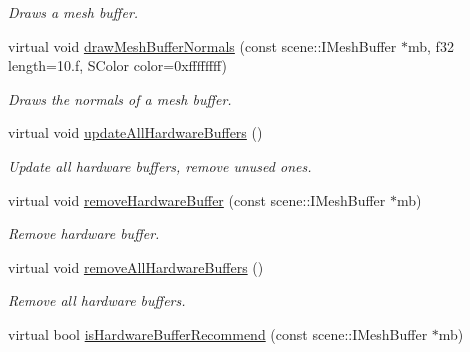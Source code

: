 \begin{DoxyCompactItemize}
\begin{DoxyCompactList}\small\item\em Draws a mesh buffer. \end{DoxyCompactList}\item 
\hypertarget{classirr_1_1video_1_1_c_null_driver_a63b636053102de5c2d72970001cf6ae7}{virtual void \hyperlink{classirr_1_1video_1_1_c_null_driver_a63b636053102de5c2d72970001cf6ae7}{draw\-Mesh\-Buffer\-Normals} (const scene\-::\-I\-Mesh\-Buffer $\ast$mb, f32 length=10.f, S\-Color color=0xffffffff)}\label{classirr_1_1video_1_1_c_null_driver_a63b636053102de5c2d72970001cf6ae7}

\begin{DoxyCompactList}\small\item\em Draws the normals of a mesh buffer. \end{DoxyCompactList}\item 
\hypertarget{classirr_1_1video_1_1_c_null_driver_a30a7473263d5fa362b1979d1191d2c8f}{virtual void \hyperlink{classirr_1_1video_1_1_c_null_driver_a30a7473263d5fa362b1979d1191d2c8f}{update\-All\-Hardware\-Buffers} ()}\label{classirr_1_1video_1_1_c_null_driver_a30a7473263d5fa362b1979d1191d2c8f}

\begin{DoxyCompactList}\small\item\em Update all hardware buffers, remove unused ones. \end{DoxyCompactList}\item 
\hypertarget{classirr_1_1video_1_1_c_null_driver_a757276dbbfcfca2227155bbef3fa3e29}{virtual void \hyperlink{classirr_1_1video_1_1_c_null_driver_a757276dbbfcfca2227155bbef3fa3e29}{remove\-Hardware\-Buffer} (const scene\-::\-I\-Mesh\-Buffer $\ast$mb)}\label{classirr_1_1video_1_1_c_null_driver_a757276dbbfcfca2227155bbef3fa3e29}

\begin{DoxyCompactList}\small\item\em Remove hardware buffer. \end{DoxyCompactList}\item 
\hypertarget{classirr_1_1video_1_1_c_null_driver_ace3efbdcbf669ba1814937fbeb3ae82a}{virtual void \hyperlink{classirr_1_1video_1_1_c_null_driver_ace3efbdcbf669ba1814937fbeb3ae82a}{remove\-All\-Hardware\-Buffers} ()}\label{classirr_1_1video_1_1_c_null_driver_ace3efbdcbf669ba1814937fbeb3ae82a}

\begin{DoxyCompactList}\small\item\em Remove all hardware buffers. \end{DoxyCompactList}\item 
\hypertarget{classirr_1_1video_1_1_c_null_driver_a5c9d77ba3c60822b92fcb7cb5dbe5760}{virtual bool \hyperlink{classirr_1_1video_1_1_c_null_driver_a5c9d77ba3c60822b92fcb7cb5dbe5760}{is\-Hardware\-Buffer\-Recommend} (const scene\-::\-I\-Mesh\-Buffer $\ast$mb)}\label{classirr_1_1video_1_1_c_null_driver_a5c9d77ba3c60822b92fcb7cb5dbe5760}


\end{DoxyCompactItemize}
